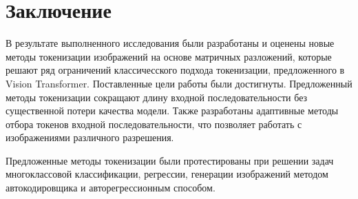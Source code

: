 \section*{Заключение}

В результате выполненного исследования были разработаны и оценены новые методы токенизации изображений на основе матричных разложений, которые решают ряд ограничений классичесского подхода токенизации, предложенного в Vision Transformer. Поставленные цели работы были достигнуты. Предложенный методы токенизации сокращают длину входной последовательности без существенной потери качества модели. Также разработаны адаптивные методы отбора токенов входной последовательности, что позволяет работать с изображениями различного разрешения.

Предложенные методы токенизации были протестированы при решении задач многоклассовой классификации, регрессии, генерации изображений методом автокодировщика и авторегрессионным способом. 



